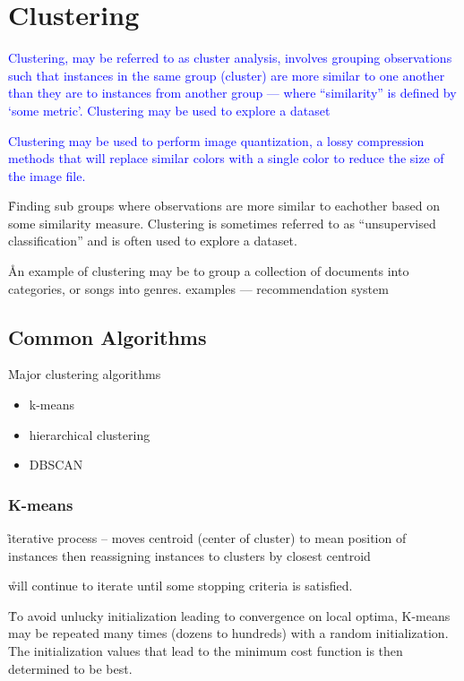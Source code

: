\section{Clustering}

\textcolor{blue}{Clustering, may be referred to as cluster analysis, involves grouping observations such that instances in the same group (cluster) are more similar to one another than they are to instances from another group --- where ``similarity'' is defined by `some metric'. Clustering may be used to explore a dataset}

\textcolor{blue}{Clustering may be used to perform {image quantization}, a lossy compression methods that will replace similar colors with a single color to reduce the size of the image file.}

\r{Finding sub groups where observations are more similar to eachother based on some similarity measure. Clustering is sometimes referred to as ``unsupervised classification'' and is often used to explore a dataset.}

\r{An example of clustering may be to group a collection of documents into categories, or songs into genres. examples --- recommendation system}

\subsection{Common Algorithms}

\r{Major clustering algorithms}
\begin{itemize}[noitemsep,topsep=0pt]
	\item k-means
	\item hierarchical clustering
	\item DBSCAN
\end{itemize}

\subsubsection{K-means}

\r{iterative process -- moves centroid (center of cluster) to mean position of instances then reassigning instances to clusters by closest centroid}

\r{will continue to iterate until some stopping criteria is satisfied.}

\r{To avoid unlucky initialization leading to convergence on local optima, K-means may be repeated many times (dozens to hundreds) with a random initialization. The initialization values that lead to the minimum cost function is then determined to be best.}


